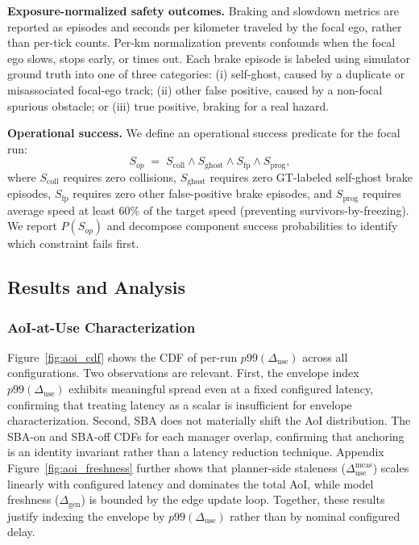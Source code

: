 \textbf{Exposure-normalized safety outcomes.}
Braking and slowdown metrics are reported as episodes and seconds per kilometer traveled by the focal ego, rather than per-tick counts. Per-km normalization prevents confounds when the focal ego slows, stops early, or times out. Each brake episode is labeled using simulator ground truth into one of three categories: (i) self-ghost, caused by a duplicate or misassociated focal-ego track; (ii) other false positive, caused by a non-focal spurious obstacle; or (iii) true positive, braking for a real hazard.

\textbf{Operational success.}
We define an operational success predicate for the focal run:
\[
S_{op} \;=\; S_{\text{coll}} \wedge S_{\text{ghost}} \wedge S_{\text{fp}} \wedge S_{\text{prog}},
\]
where $S_{\text{coll}}$ requires zero collisions, $S_{\text{ghost}}$ requires zero GT-labeled self-ghost brake episodes, $S_{\text{fp}}$ requires zero other false-positive brake episodes, and $S_{\text{prog}}$ requires average speed at least 60\% of the target speed (preventing survivors-by-freezing). We report $P(S_{op})$ and decompose component success probabilities to identify which constraint fails first.

\subsection{Results and Analysis}



\subsubsection{AoI-at-Use Characterization}
\label{sec:eval:aoi}

Figure~\ref{fig:aoi_cdf} shows the CDF of per-run $p99(\Delta_{\text{use}})$ across all configurations. Two observations are relevant. First, the envelope index $p99(\Delta_{\text{use}})$ exhibits meaningful spread even at a fixed configured latency, confirming that treating latency as a scalar is insufficient for envelope characterization. Second, SBA does not materially shift the AoI distribution. The SBA-on and SBA-off CDFs for each manager overlap, confirming that anchoring is an identity invariant rather than a latency reduction technique. Appendix Figure~\ref{fig:aoi_freshness} further shows that planner-side staleness ($\Delta_{\text{use}}^{\text{meas}}$) scales linearly with configured latency and dominates the total AoI, while model freshness ($\Delta_{\text{gen}}$) is bounded by the edge update loop. Together, these results justify indexing the envelope by $p99(\Delta_{\text{use}})$ rather than by nominal configured delay.

